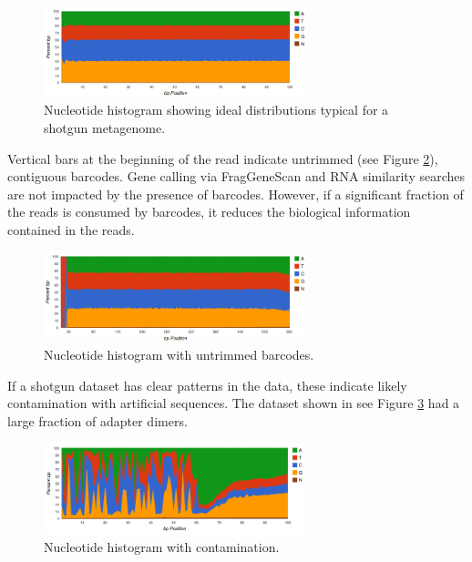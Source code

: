 \documentclass[12pt,fullpage]{report}
\begin{document}
\begin{figure}[ht]
\begin{center}
\includegraphics[width=3in]{Images/nucleotide-hist-ok.png}
\end{center}
\caption{
Nucleotide histogram showing ideal distributions typical for a shotgun metagenome.
}
\label{fig:nucleotide-hist-ok}
\end{figure}


Vertical bars at the beginning of the read indicate untrimmed (see Figure \ref{fig:nucleotide-hist-barcodes}), contiguous barcodes. Gene calling via FragGeneScan \cite{FGS} and \gls{RNA} similarity searches are not impacted by the presence of barcodes. However, if a significant fraction of the reads is consumed by barcodes, it reduces the biological information contained in the reads.

\begin{figure}[ht]
\begin{center}
\includegraphics[width=3in]{Images/nucleotide-hist-barcodes.png}
\end{center}
\caption{
Nucleotide histogram with untrimmed barcodes.
}
\label{fig:nucleotide-hist-barcodes}
\end{figure}


If a shotgun dataset has clear patterns in the data,
these indicate likely contamination with artificial sequences.
The dataset shown in see Figure \ref{fig:nucleotide-with-contamination}
had a large fraction of adapter dimers.

\begin{figure}
\begin{center}
\includegraphics[width=3in]{Images/nucleotide-with-contamination.png}
\end{center}
\caption{
Nucleotide histogram with contamination.
}
\label{fig:nucleotide-with-contamination}
\end{figure}
\end{document}
